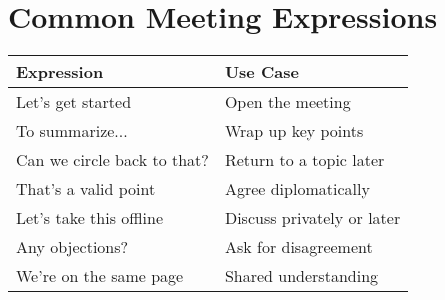 \section*{Common Meeting Expressions}
	
	\begin{tabularx}{\textwidth}{|l|X|}
		\hline
		\textbf{Expression} & \textbf{Use Case} \\
		\hline
		Let’s get started & Open the meeting \\
		\hline
		To summarize... & Wrap up key points \\
		\hline
		Can we circle back to that? & Return to a topic later \\
		\hline
		That’s a valid point & Agree diplomatically \\
		\hline
		Let’s take this offline & Discuss privately or later \\
		\hline
		Any objections? & Ask for disagreement \\
		\hline
		We’re on the same page & Shared understanding \\
		\hline
	\end{tabularx}
	


